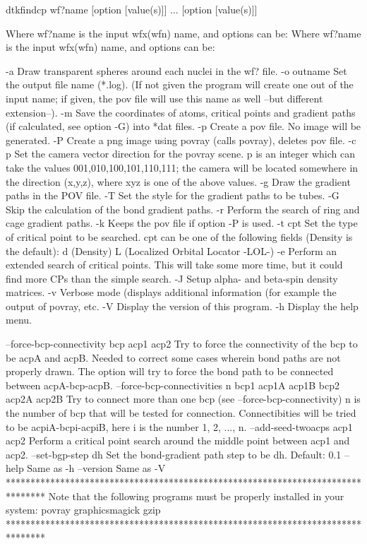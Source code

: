 	dtkfindcp wf?name [option [value(s)]] ... [option [value(s)]]

Where wf?name is the input wfx(wfn) name, and options can be:
Where wf?name is the input wfx(wfn) name, and options can be:

  -a        	Draw transparent spheres around each nuclei in the wf? file.
  -o outname	Set the output file name (*.log).
            	  (If not given the program will create one out of
            	  the input name; if given, the pov file will
            	  use this name as well --but different extension--).
  -m        	Save the coordinates of atoms, critical points and gradient
            	  paths (if calculated, see option -G) into *dat files.
  -p     	Create a pov file. No image will be generated.
  -P     	Create a png image using povray (calls povray),
         	  deletes pov file.
  -c p   	Set the camera vector direction for the povray scene.
         	  p is an integer which can take the values
         	  001,010,100,101,110,111; the camera will be located
         	  somewhere in the direction (x,y,z), where xyz is one of 
         	  the above values.
  -g     	Draw the gradient paths in the POV file.
  -T     	Set the style for the gradient paths to be tubes.
  -G     	Skip the calculation of the bond gradient paths.
  -r     	Perform the search of ring and cage gradient paths.
  -k     	Keeps the pov file if option -P is used.
  -t cpt 	Set the type of critical point to be searched. cpt can be 
         	  one of the following fields (Density is the default):
         		d (Density)
         		L (Localized Orbital Locator -LOL-)
  -e     	Perform an extended search of critical points. This
         	  will take some more time, but it could find more CPs
         	  than the simple search.
  -J     	Setup alpha- and beta-spin density matrices.
  -v     	Verbose mode (displays additional information (for example the 
         	  output of povray, etc.
  -V        	Display the version of this program.
  -h		Display the help menu.

  --force-bcp-connectivity bcp acp1 acp2 	Try to force the connectivity
            		  of the bcp to be acpA and acpB. Needed to correct some
            		  cases wherein bond paths are not properly drawn.
            		  The option will try to force the bond path to be
            		  connected between acpA-bcp-acpB.
  --force-bcp-connectivities n bcp1 acp1A acp1B bcp2 acp2A acp2B
            		  Try to connect more than one bcp (see --force-bcp-connectivity)
            		  n is the number of bcp that will be tested for connection.
            		  Connectibities will be tried to be acpiA-bcpi-acpiB,
            		  here i is the number 1, 2, ..., n.
  --add-seed-twoacps acp1 acp2
            		Perform a critical point search around
            		  the middle point between acp1 and acp2.
  --set-bgp-step dh
            		Set the bond-gradient path step to be dh. Default: 0.1
  --help    		Same as -h
  --version 		Same as -V
********************************************************************************
  Note that the following programs must be properly installed in your system:
                                     povray
                                 graphicsmagick
                                      gzip
********************************************************************************
